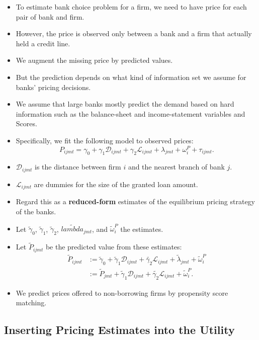\documentclass[
]{book}
\providecommand{\tightlist}{%
  \setlength{\itemsep}{0pt}\setlength{\parskip}{0pt}}
\begin{document}
\begin{itemize}
\tightlist
\item
  To estimate bank choice problem for a firm, we need to have price for each pair of bank and firm.
\item
  However, the price is observed only between a bank and a firm that actually held a credit line.
\item
  We augment the missing price by predicted values.
\item
  But the prediction depends on what kind of information set we assume for banks' pricing decisions.
\item
  We assume that large banks mostly predict the demand based on hard information such as the balance-sheet and income-statement variables and Scores.
\item
  Specifically, we fit the following model to observed prices:
  \[
  P_{ijmt} = \gamma_0 + \gamma_1 \mathcal{D}_{ijmt} + \gamma_2 \mathcal{L}_{ijmt} + \lambda_{jmt} + \omega_i^P + \tau_{ijmt}.
  \]
\item
  \(\mathcal{D}_{ijmt}\) is the distance between firm \(i\) and the nearest branch of bank \(j\).
\item
  \(\mathcal{L}_{ijmt}\) are dummies for the size of the granted loan amount.
\item
  Regard this as a \textbf{reduced-form} estimates of the equilibrium pricing strategy of the banks.
\item
  Let \(\tilde{\gamma}_0\), \(\tilde{\gamma}_1\), \(\tilde{\gamma}_2\), \(\tilde{lambda}_{jmt}\), and \(\tilde{\omega}_i^P\) the estimates.
\item
  Let \(\tilde{P}_{ijmt}\) be the predicted value from these estimates:
  \begin{equation}
  \begin{split}
  \tilde{P}_{ijmt} &:= \tilde{\gamma}_0 + \tilde{\gamma}_1 \mathcal{D}_{ijmt} + \tilde{\gamma_2} \mathcal{L}_{ijmt} + \tilde{\lambda}_{jmt} + \tilde{\omega}_i^P\\
  &:= \tilde{P}_{jmt} + \tilde{\gamma}_1 \mathcal{D}_{ijmt} + \tilde{\gamma_2} \mathcal{L}_{ijmt} + \tilde{\omega}_i^P.
  \end{split} \label{eq:price-predicted}
  \end{equation}
\item
  We predict prices offered to non-borrowing firms by propensity score matching.
\end{itemize}

\hypertarget{inserting-pricing-estimates-into-the-utility}{%
\subsection{Inserting Pricing Estimates into the Utility}\label{inserting-pricing-estimates-into-the-utility}}
\end{document}
